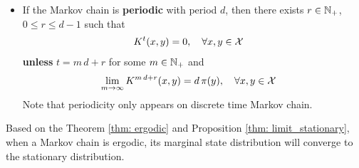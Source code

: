 \documentclass[11pt]{article}
\begin{document}
\begin{itemize}
\begin{theorem}
\begin{itemize}
\item If the Markov chain is \textbf{periodic} with period $d$, then there exists $r \in {\mathbb N}_{+}$,  $0\le r\le d-1$ such that
\begin{align}
K^{t}(x, y) &= 0, \quad \forall x, y\in {\mathcal X} \label{eqn: mc_periodic}
\end{align} \textbf{unless} $t = m\,d + r$ for some $m\in {\mathbb N}_{+}$ and
\begin{align}
\lim_{m\rightarrow \infty}K^{m\,d + r}(x, y) &= d\,\pi(y), \quad \forall x, y\in {\mathcal X} \label{eqn: mc_periodic_2}
\end{align} Note that periodicity only appears on discrete time Markov chain.
\end{itemize}
\end{theorem}
Based on the Theorem \ref{thm: ergodic} and Proposition \ref{thm: limit_stationary}, when a Markov chain is ergodic, its marginal state distribution will converge to the stationary distribution.
\end{itemize}
\end{document}
